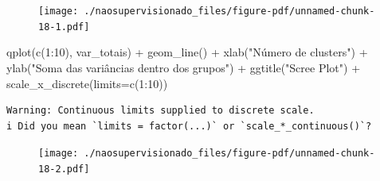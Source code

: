 \documentclass[
  letterpaper,
  DIV=11,
  numbers=noendperiod]{scrreprt}
\newenvironment{Shaded}{\begin{snugshade}}{\end{snugshade}}
\newcommand{\AttributeTok}[1]{\textcolor[rgb]{0.40,0.45,0.13}{#1}}
\newcommand{\ControlFlowTok}[1]{\textcolor[rgb]{0.00,0.23,0.31}{#1}}
\newcommand{\DecValTok}[1]{\textcolor[rgb]{0.68,0.00,0.00}{#1}}
\newcommand{\FunctionTok}[1]{\textcolor[rgb]{0.28,0.35,0.67}{#1}}
\newcommand{\NormalTok}[1]{\textcolor[rgb]{0.00,0.23,0.31}{#1}}
\newcommand{\OtherTok}[1]{\textcolor[rgb]{0.00,0.23,0.31}{#1}}
\newcommand{\SpecialCharTok}[1]{\textcolor[rgb]{0.37,0.37,0.37}{#1}}
\newcommand{\StringTok}[1]{\textcolor[rgb]{0.13,0.47,0.30}{#1}}
\begin{document}
\begin{Shaded}
\end{Shaded}

\begin{figure}[H]

{\centering \texttt{[image: ./naosupervisionado\_files/figure-pdf/unnamed-chunk-18-1.pdf]}

}

\end{figure}

\begin{Shaded}
\begin{Highlighting}[]
\FunctionTok{qplot}\NormalTok{(}\FunctionTok{c}\NormalTok{(}\DecValTok{1}\SpecialCharTok{:}\DecValTok{10}\NormalTok{), var\_totais) }\SpecialCharTok{+} 
  \FunctionTok{geom\_line}\NormalTok{() }\SpecialCharTok{+} 
  \FunctionTok{xlab}\NormalTok{(}\StringTok{"Número de clusters"}\NormalTok{) }\SpecialCharTok{+} 
  \FunctionTok{ylab}\NormalTok{(}\StringTok{"Soma das variâncias dentro dos grupos"}\NormalTok{) }\SpecialCharTok{+}
  \FunctionTok{ggtitle}\NormalTok{(}\StringTok{"Scree Plot"}\NormalTok{) }\SpecialCharTok{+}
  \FunctionTok{scale\_x\_discrete}\NormalTok{(}\AttributeTok{limits=}\FunctionTok{c}\NormalTok{(}\DecValTok{1}\SpecialCharTok{:}\DecValTok{10}\NormalTok{))}
\end{Highlighting}
\end{Shaded}

\begin{verbatim}
Warning: Continuous limits supplied to discrete scale.
i Did you mean `limits = factor(...)` or `scale_*_continuous()`?
\end{verbatim}

\begin{figure}[H]

{\centering \texttt{[image: ./naosupervisionado\_files/figure-pdf/unnamed-chunk-18-2.pdf]}

}

\end{figure}
\end{document}
